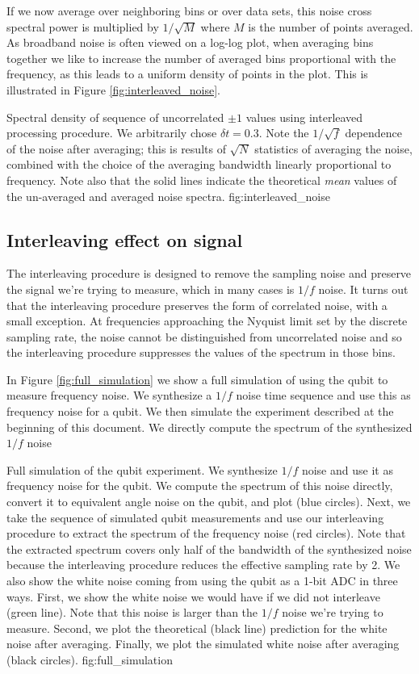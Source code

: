 \documentclass[twocolumn]{article}
\begin{document}
If we now average over neighboring bins or over data sets, this noise cross spectral power is multiplied by $1/\sqrt{M}$ where $M$ is the number of points averaged.
As broadband noise is often viewed on a log-log plot, when averaging bins together we like to increase the number of averaged bins proportional with the frequency, as this leads to a uniform density of points in the plot.
This is illustrated in Figure \ref{fig:interleaved_noise}.

{Spectral density of sequence of uncorrelated $\pm 1$ values using interleaved processing procedure.
We arbitrarily chose $\delta t = 0.3$.
Note the $1/\sqrt{f}$ dependence of the noise after averaging; this is results of $\sqrt{N}$ statistics of averaging the noise, combined with the choice of the averaging bandwidth linearly proportional to frequency.
Note also that the solid lines indicate the theoretical \emph{mean} values of the un-averaged and averaged noise spectra.}
{fig:interleaved_noise}

\subsection{Interleaving effect on signal}

The interleaving procedure is designed to remove the sampling noise and preserve the signal we're trying to measure, which in many cases is $1/f$ noise.
It turns out that the interleaving procedure preserves the form of correlated noise, with a small exception.
At frequencies approaching the Nyquist limit set by the discrete sampling rate, the noise cannot be distinguished from uncorrelated noise and so the interleaving procedure suppresses the values of the spectrum in those bins.

In Figure \ref{fig:full_simulation} we show a full simulation of using the qubit to measure frequency noise.
We synthesize a $1/f$ noise time sequence and use this as frequency noise for a qubit.
We then simulate the experiment described at the beginning of this document.
We directly compute the spectrum of the synthesized $1/f$ noise

{Full simulation of the qubit experiment.
We synthesize $1/f$ noise and use it as frequency noise for the qubit.
We compute the spectrum of this noise directly, convert it to equivalent angle noise on the qubit, and plot (blue circles).
Next, we take the sequence of simulated qubit measurements and use our interleaving procedure to extract the spectrum of the frequency noise (red circles).
Note that the extracted spectrum covers only half of the bandwidth of the synthesized noise because the interleaving procedure reduces the effective sampling rate by 2.
We also show the white noise coming from using the qubit as a 1-bit ADC in three ways.
First, we show the white noise we would have if we did not interleave (green line).
Note that this noise is larger than the $1/f$ noise we're trying to measure.
Second, we plot the theoretical (black line) prediction for the white noise after averaging.
Finally, we plot the simulated white noise after averaging (black circles).}
{fig:full_simulation}
\end{document}
